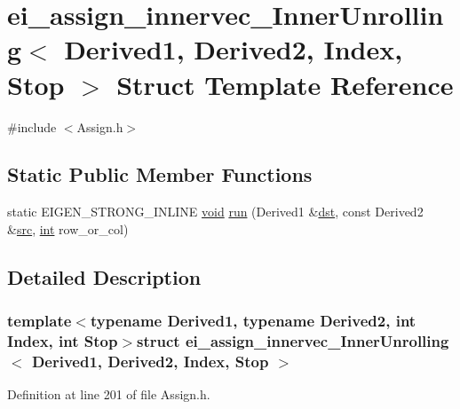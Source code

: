 \hypertarget{structei__assign__innervec___inner_unrolling}{\section{ei\-\_\-assign\-\_\-innervec\-\_\-\-Inner\-Unrolling$<$ Derived1, Derived2, Index, Stop $>$ Struct Template Reference}
\label{structei__assign__innervec___inner_unrolling}
}


{\ttfamily \#include $<$Assign.\-h$>$}

\subsection*{Static Public Member Functions}
\begin{DoxyCompactItemize}
\item 
static E\-I\-G\-E\-N\-\_\-\-S\-T\-R\-O\-N\-G\-\_\-\-I\-N\-L\-I\-N\-E \hyperlink{group___u_a_v_objects_plugin_ga444cf2ff3f0ecbe028adce838d373f5c}{void} \hyperlink{structei__assign__innervec___inner_unrolling_a70b6cff593b455e77fd419997f23c1b5}{run} (Derived1 \&\hyperlink{glext_8h_a92034251bfd455d524a9b5610cddba00}{dst}, const Derived2 \&\hyperlink{glext_8h_a72e0fdf0f845ded60b1fada9e9195cd7}{src}, \hyperlink{ioapi_8h_a787fa3cf048117ba7123753c1e74fcd6}{int} row\-\_\-or\-\_\-col)
\end{DoxyCompactItemize}


\subsection{Detailed Description}
\subsubsection*{template$<$typename Derived1, typename Derived2, int Index, int Stop$>$struct ei\-\_\-assign\-\_\-innervec\-\_\-\-Inner\-Unrolling$<$ Derived1, Derived2, Index, Stop $>$}



Definition at line 201 of file Assign.\-h.



